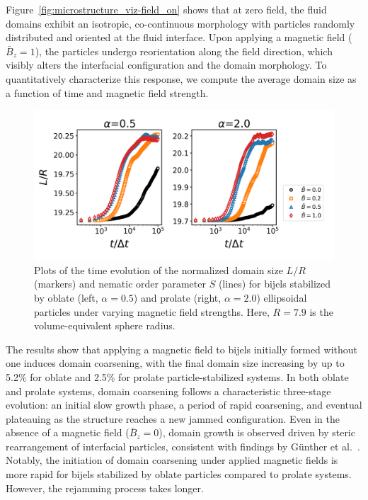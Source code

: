 Figure~\ref{fig:microstructure_viz-field_on} shows that at zero field, the fluid domains exhibit an isotropic, co-continuous morphology with particles randomly 
distributed and oriented at the fluid interface. Upon applying a magnetic field (\(\bar{B}_z = 1\)), the particles undergo reorientation along the field direction, 
which visibly alters the interfacial configuration and the domain morphology. 
To quantitatively characterize this response, we compute the average domain size as a function of time and magnetic field strength. 

\begin{figure} 
    \centering 
    \includegraphics[scale=0.6]{../figures/results/paper2/domain_size-field_on.png} 
    \caption{Plots of the time evolution of the normalized domain size \(L/R\) (markers) and nematic order parameter 
             \(S\) (lines) for bijels stabilized by oblate (left, \(\alpha = 0.5\)) and prolate (right, \(\alpha = 2.0\)) ellipsoidal particles under varying 
             magnetic field strengths. Here, \(R = 7.9\) is the volume-equivalent sphere radius.} 
    \label{fig:domain_size-field_on} 
\end{figure}

The results show that applying a magnetic field to bijels 
initially formed without one induces domain coarsening, with the final domain size increasing by up to 5.2\% for oblate and 2.5\% for 
prolate particle-stabilized systems.
In both oblate and prolate systems, domain coarsening follows a characteristic three-stage evolution: an initial slow growth phase, a period of rapid 
coarsening, and eventual plateauing as the structure reaches a new jammed configuration. Even in the absence of a magnetic field (\(\bar{B}_z = 0\)), 
domain growth is observed driven by steric rearrangement of interfacial particles, consistent 
with findings by Günther et al.~\cite{gunther_timescales_2014}. Notably, the initiation of domain coarsening under applied magnetic fields is more rapid 
for bijels stabilized by oblate particles compared to prolate systems. However, the rejamming process takes longer.

